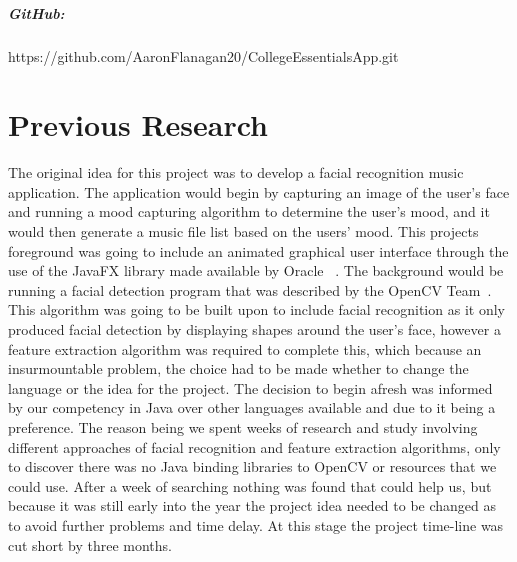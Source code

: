 \paragraph{GitHub:} https://github.com/AaronFlanagan20/CollegeEssentialsApp.git

\chapter*{Previous Research}
The original idea for this project was to develop a facial recognition music application. The application would begin by capturing an image of the user's face and running a mood capturing algorithm to determine the user's mood, and it would then generate a music file list based on the users' mood. This projects foreground was going to include an animated graphical user interface through the use of the JavaFX library made available by Oracle ~\cite{javafx}. The background would be running a facial detection program that was described by the OpenCV Team~\cite{opencv}. This algorithm was going to be built upon to include facial recognition as it only produced facial detection by displaying shapes around the user's face, however a feature extraction algorithm was required to complete this, which because an insurmountable problem, the choice had to be made whether to change the language or the idea for the project. The decision to begin afresh was informed by our competency in Java over other languages available and due to it being a preference. The reason being we spent weeks of research and study involving different approaches of facial recognition and feature extraction algorithms, only to discover there was no Java binding libraries to OpenCV or resources that we could use. After a week of searching nothing was found that could help us, but because it was still early into the year the project idea needed to be changed as to avoid further problems and time delay. At this stage the project time-line was cut short by three months.

